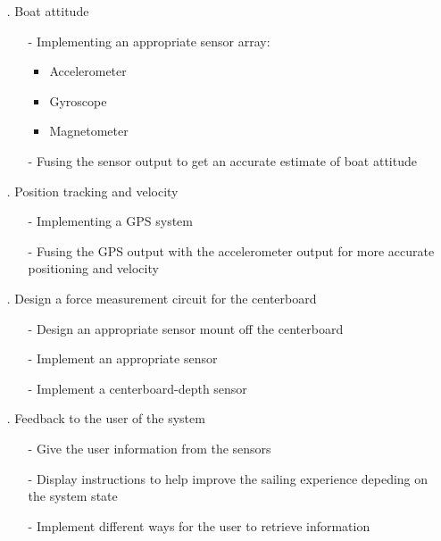 \begin{itemize}
	\item[.] Boat attitude
	\begin{itemize}
		\item[-] Implementing an appropriate sensor array:
		\begin{itemize}
			\item Accelerometer
			\item Gyroscope
			\item Magnetometer
		\end{itemize}
		\item[-] Fusing the sensor output to get an accurate estimate of boat attitude
	\end{itemize}
	\item[.] Position tracking and velocity
	\begin{itemize}
		\item[-] Implementing a GPS system
		\item[-] Fusing the GPS output with the accelerometer output for more accurate positioning and velocity
	\end{itemize}
	\item[.] Design a force measurement circuit for the centerboard
	\begin{itemize}
		\item[-] Design an appropriate sensor mount off the centerboard
		\item[-] Implement an appropriate sensor
		\item[-] Implement a centerboard-depth sensor
	\end{itemize}
	\item[.] Feedback to the user of the system
	\begin{itemize}
		\item[-] Give the user information from the sensors
		\item[-] Display instructions to help improve the sailing experience depeding on the system state
		\item[-] Implement different ways for the user to retrieve information
	\end{itemize}
\end{itemize}

